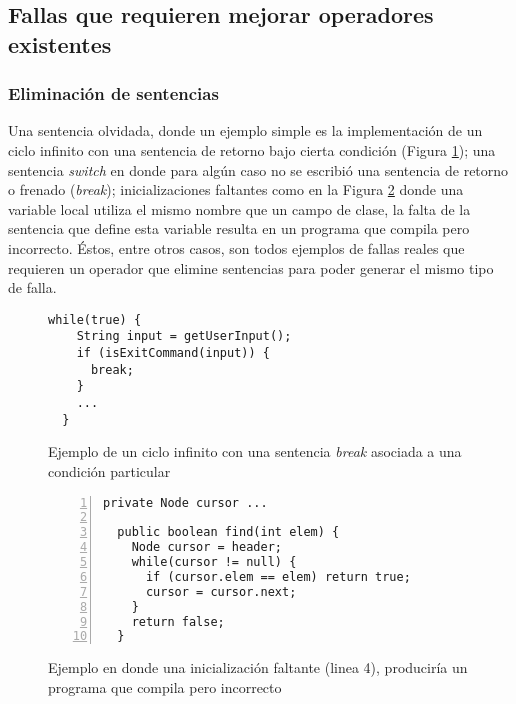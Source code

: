 \subsection{Fallas que requieren mejorar operadores existentes}

\subsubsection{Eliminaci\'on de sentencias}

Una sentencia olvidada, donde un ejemplo simple es la implementaci\'on de un ciclo infinito con una sentencia de retorno bajo cierta condici\'on (Figura \ref{figures.examples.infCicle}); una sentencia \emph{switch} en donde para alg\'un caso no se escribi\'o una sentencia de retorno o frenado (\emph{break}); inicializaciones faltantes como en la Figura \ref{figures.examples.localVariableHidingField} donde una variable local utiliza el mismo nombre que un campo de clase, la falta de la sentencia que define esta variable resulta en un programa que compila pero incorrecto. \'Estos, entre otros casos, son todos ejemplos de fallas reales que requieren un operador que elimine sentencias para poder generar el mismo tipo de falla.

\begin{figure}
	\begin{lstlisting}[frame=single, mathescape=true,framexleftmargin=1.5em]
  while(true) {
    String input = getUserInput();
    if (isExitCommand(input)) {
      break;
    }
    ...
  }
	\end{lstlisting}
	\caption{Ejemplo de un ciclo infinito con una sentencia \emph{break} asociada a una condici\'on particular}
	\label{figures.examples.infCicle}
\end{figure}

\begin{figure}
	\begin{lstlisting}[frame=single, numbers=left, mathescape=true,framexleftmargin=1.5em]
  private Node cursor ...
	
  public boolean find(int elem) {
    Node cursor = header;
    while(cursor != null) {
      if (cursor.elem == elem) return true;
      cursor = cursor.next;
    }
    return false;
  }
	\end{lstlisting}
	\caption{Ejemplo en donde una inicializaci\'on faltante (linea 4), producir\'ia un programa que compila pero incorrecto}
	\label{figures.examples.localVariableHidingField}
\end{figure}

